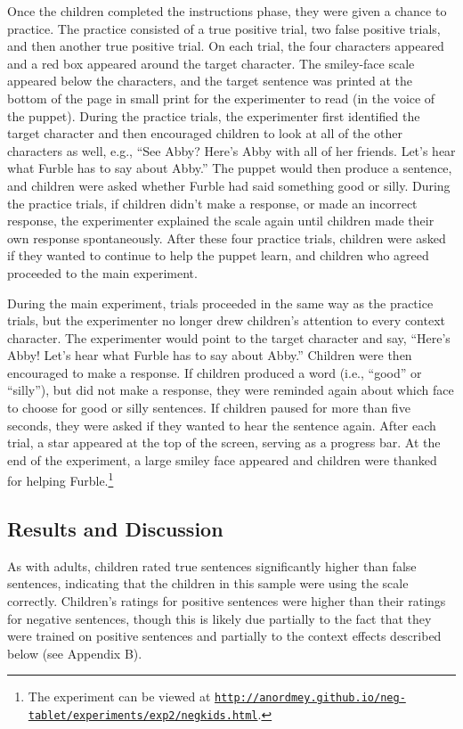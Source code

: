 \documentclass[man, noapacite]{apa2}
\begin{document}
Once the children completed the instructions phase, they were given a chance to practice. The practice consisted of a true positive trial, two false positive trials, and then another true positive trial. On each trial, the four characters appeared and a red box appeared around the target character. The smiley-face scale appeared below the characters, and the target sentence was printed at the bottom of the page in small print for the experimenter to read (in the voice of the puppet). During the practice trials, the experimenter first identified the target character and then encouraged children to look at all of the other characters as well, e.g., ``See Abby? Here's Abby with all of her friends. Let's hear what Furble has to say about Abby.'' The puppet would then produce a sentence, and children were asked whether Furble had said something good or silly. During the practice trials, if children didn't make a response, or made an incorrect response, the experimenter explained the scale again until children made their own response spontaneously. After these four practice trials, children were asked if they wanted to continue to help the puppet learn, and children who agreed proceeded to the main experiment.

During the main experiment, trials proceeded in the same way as the practice trials, but the experimenter no longer drew children's attention to every context character. The experimenter would point to the target character and say, ``Here's Abby! Let's hear what Furble has to say about Abby.'' Children were then encouraged to make a response. If children produced a word (i.e., ``good'' or ``silly''), but did not make a response, they were reminded again about which face to choose for good or silly sentences. If children paused for more than five seconds, they were asked if they wanted to hear the sentence again. After each trial, a star appeared at the top of the screen, serving as a progress bar. At the end of the experiment, a large smiley face appeared and children were thanked for helping Furble.\footnote{The experiment can be viewed at \href{http://anordmey.github.io/neg-tablet/experiments/exp2/negkids.html}{\nolinkurl{http://anordmey.github.io/neg-tablet/experiments/exp2/negkids.html}}.}

\subsection{Results and Discussion}

As with adults, children rated true sentences significantly higher than false sentences, indicating that the children in this sample were using the scale correctly. Children's ratings for positive sentences were higher than their ratings for negative sentences, though this is likely due partially to the fact that they were trained on positive sentences and partially to the context effects described below (see Appendix B).
\end{document}
